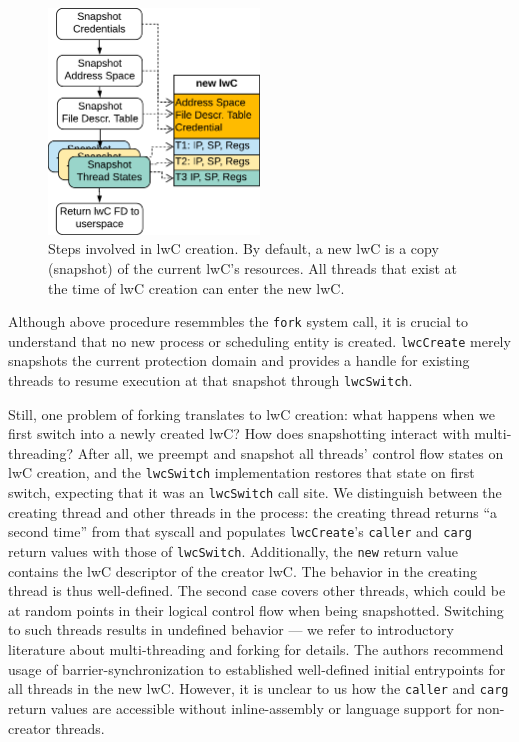 \documentclass[10pt,twocolumn,a4paper]{article}
\begin{document}
\begin{figure}
  \centering
  \includegraphics[height=6cm]{fig/lwc-creation-sequence-diagram}
  \caption{
    Steps involved in lwC creation.
    By default, a new lwC is a copy (snapshot) of the current lwC's resources.
    All threads that exist at the time of lwC creation can enter the new lwC.
  }
\label{design:fig:lwccreationsequencediagram}
\end{figure}

Although above procedure resemmbles the \lstinline{fork} system call, it is crucial to understand that no new process or scheduling entity is created.
\lstinline{lwcCreate} merely snapshots the current protection domain and provides a handle for existing threads to resume execution at that snapshot through \lstinline{lwcSwitch}.

Still, one problem of forking translates to lwC creation:
what happens when we first switch into a newly created lwC? How does snapshotting interact with multi-threading?
After all, we preempt and snapshot all threads' control flow states on lwC creation, and the \lstinline{lwcSwitch} implementation restores that state on first switch, expecting that it was an \lstinline{lwcSwitch} call site.
We distinguish between the creating thread and other threads in the process:
the creating thread returns \enquote{a second time} from that syscall and populates \lstinline{lwcCreate}'s \lstinline{caller} and \lstinline{carg} return values with those of \lstinline{lwcSwitch}.
Additionally, the \lstinline{new} return value contains the lwC descriptor of the creator lwC.
The behavior in the creating thread is thus well-defined.
The second case covers other threads, which could be at random points in their logical control flow when being snapshotted.
Switching to such threads results in undefined behavior --- we refer to introductory literature about multi-threading and forking for details.
The authors recommend usage of barrier-synchronization to established well-defined initial entrypoints for all threads in the new lwC.
However, it is unclear to us how the \lstinline{caller} and \lstinline{carg} return values are accessible without inline-assembly or language support for non-creator threads.
\cite{lwcpaper}
\end{document}
